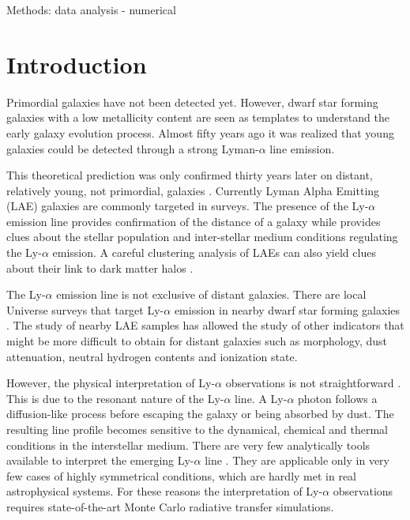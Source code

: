 \documentclass[a4,useAMS,usenatbib,usegraphicx]{mn2e}
\begin{document}
\begin{keywords}
Methods: data analysis - numerical 
\end{keywords}



\section{Introduction}
\label{sec:introduction}





Primordial galaxies have not been detected yet. 
However, dwarf star forming galaxies with a low metallicity content
are seen as templates to understand the early galaxy evolution process. 
Almost fifty years ago \citep{PartridgePeebles} it was realized that
young galaxies could be detected through a strong Lyman-$\alpha$ line
emission.  


This theoretical prediction was only confirmed thirty years later on
distant, relatively young, not primordial, galaxies \citep{1998ApJ...498L..93D}.
Currently Lyman Alpha Emitting (LAE) galaxies are commonly targeted
in surveys. 
The presence of the Ly-$\alpha$ emission line provides confirmation of
the distance of a galaxy while provides clues about the stellar
population and inter-stellar medium conditions regulating the
Ly-$\alpha$ emission.
A careful clustering analysis of LAEs can also yield clues about their link
to dark matter halos \cite{2016ApJ...828....5M}.

The Ly-$\alpha$ emission line is not exclusive of distant galaxies. 
There are local Universe surveys that target Ly-$\alpha$ emission in nearby dwarf star forming galaxies  \citep{LARS}. 
The study of nearby LAE samples has allowed the study of other
indicators that might be more difficult to obtain for distant galaxies
such as morphology, dust attenuation, neutral hydrogen contents and
ionization state.  

However, the physical interpretation of Ly-$\alpha$ observations is
not straightforward \citep{2015ApJ...805...14R}. 
This is due to the resonant nature of the Ly-$\alpha$ line. 
A Ly-$\alpha$ photon follows a diffusion-like process before escaping
the galaxy or being absorbed by dust. 
The resulting line profile becomes sensitive to the dynamical, chemical
and thermal conditions in the interstellar medium. 
There are very few analytically tools available to interpret the
emerging Ly-$\alpha$ line
\cite{Harrington73,1991ApJ...370L..85N,LoebRybicki,2006ApJ...645..792T}. 
They are applicable only in very few cases of highly symmetrical
conditions, which are hardly met in real astrophysical systems.
For these reasons the interpretation of Ly-$\alpha$ observations
requires state-of-the-art Monte Carlo radiative transfer simulations.   
\end{document}
